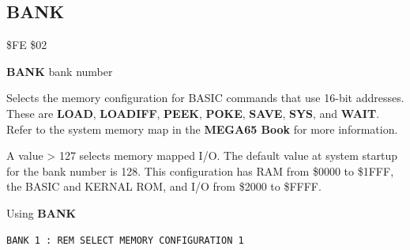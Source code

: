 
\newpage
\subsection{BANK}
\label{BASIC 65 Commands!BANK}
\begin{description}[leftmargin=2cm,style=nextline]
\item [Token:]   \$FE \$02

\item [Format:]  {\bf BANK} bank number

\item [Usage:]   Selects the memory configuration for BASIC commands that use 16-bit addresses. These are {\bf LOAD}, {\bf LOADIFF}, {\bf PEEK}, {\bf POKE}, {\bf SAVE}, {\bf SYS}, and {\bf WAIT}. Refer to the system memory map in \ifdefined\printmanual
   the {\bf MEGA65 Book}
\else
\fi for more information.

\item [Remarks:] A value > 127 selects memory mapped I/O.
                 The default value at system startup for the bank number is 128.
                 This configuration has RAM from \$0000 to \$1FFF,
                 the BASIC and KERNAL ROM, and I/O from \$2000 to \$FFFF.
\item [Example:] Using {\bf BANK}

\begin{tcolorbox}[colback=black,coltext=white]
\verbatimfont{\codefont}
\begin{verbatim}
BANK 1 : REM SELECT MEMORY CONFIGURATION 1
\end{verbatim}
\end{tcolorbox}
\end{description}


\newpage
